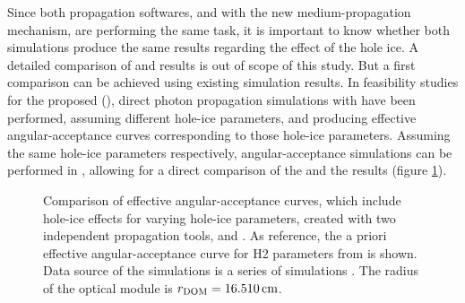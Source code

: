 Since both propagation softwares, \ppc and \clsim with the new
medium-propagation mechanism, are performing the same task, it is
important to know whether both simulations produce the same results
regarding the effect of the hole ice. A detailed comparison of \ppc and
\clsim results is out of scope of this study. But a first comparison can
be achieved using existing \ppc simulation results. \followup
In feasibility studies for the proposed
 (), direct
photon propagation simulations with \ppc have been performed, assuming
different hole-ice parameters, and producing effective
angular-acceptance curves corresponding to those hole-ice parameters.
\cite{pocam, icrc17pocam} Assuming the same hole-ice parameters
respectively, angular-acceptance simulations can be performed in \clsim,
allowing for a direct comparison of the \ppc and the \clsim results
(figure \ref{fig:Ou7fux1o}).


\begin{figure}[htbp]
  \hfill
  \hfill
  \hfill
  \hfill
  \caption{Comparison of effective angular-acceptance curves, which include hole-ice effects for varying hole-ice parameters, created with two independent propagation tools, \ppc and \clsim. As reference, the a priori effective angular-acceptance curve for H2 parameters from \cite{icepaper} is shown. Data source of the \ppc simulations is a series of  simulations \cite{icrc17pocam}. The radius of the optical module is $r_\text{DOM} = 16.510\text{\,cm}$.}
  \label{fig:Ou7fux1o}
\end{figure}

